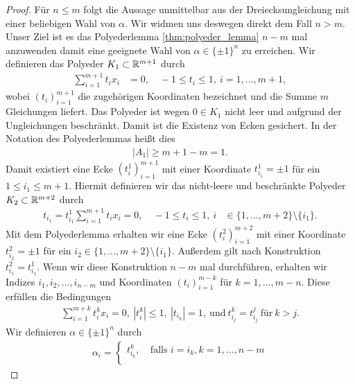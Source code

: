 \begin{proof}
	Für $ n \leq m $ folgt die Aussage unmittelbar aus der Dreiecksungleichung mit einer beliebigen Wahl von $ \alpha $.
	Wir widmen uns deswegen direkt dem Fall $ n > m $. 
	Unser Ziel ist es das Polyederlemma \ref{thm:polyeder_lemma} $ n-m $ mal anzuwenden damit eine geeignete Wahl von $  \alpha \in \{\pm 1\}^n  $ zu erreichen.
	Wir definieren das Polyeder $ K_1 \subset \mathbb{R}^{m+1} $ durch
	\begin{align*}
		\sum \limits_{i = 1}^{m+1 } t_i x_i&= 0, \quad
		-1 \leq t_i \leq 1 , \ i = 1,..., m+1,
	\end{align*}
	wobei $ (t_i)_{i=1}^{m+1} $ die zugehörigen Koordinaten bezeichnet und die Summe $ m $ Gleichungen liefert.
	Das Polyeder ist wegen $ 0 \in K_1 $  nicht leer und aufgrund der Ungleichungen beschränkt.
	Damit ist die Existenz von Ecken gesichert. 
	In der Notation des Polyederlemmas heißt dies
	\begin{align*}
		|A_1 | \geq m+1 - m = 1.
	\end{align*}
	Damit existiert eine Ecke $ (t^1_i)_{i=1}^{m+1} $
	mit einer Koordinate $ t^1_{i_1} = \pm 1$ für ein $ 1 \leq i_1 \leq m+1 $.
	Hiermit definieren wir das nicht-leere und beschränkte Polyeder $ K_2 \subset \mathbb{R}^{m+2} $ durch
	\begin{align*}
		t_{i_1} = t_{i_1}^1
		\sum \limits_{i = 1}^{m+1 } t_i x_i = 0, \quad 
		-1 \leq t_i \leq 1 , \ i &\in \{1,...,m+2\} \setminus \{i_1\}.
	\end{align*}
	Mit dem Polyederlemma erhalten wir eine Ecke $ (t^2_i)_{i=1}^{m+2} $
	mit einer Koordinate $ t_{i_2}^2 = \pm 1 $ für ein $ i_2 \in \{1,...,m+2\} \setminus \{i_1\} $.
	Außerdem gilt nach Konstruktion $ t^2_{i_1} = t^1_{i_1} $.
	Wenn wir diese Konstruktion $ n-m $ mal durchführen, erhalten wir Indizes 
	$ i_1,i_2,...,i_{n-m} $ und Koordinaten $ (t_i)^{m-k}_{i=1} $ für $ k = 1,...,m-n $. Diese erfüllen die Bedingungen
	\begin{align*}
		\sum \limits_{i = 1}^{m+k} t_i^k x_i = 0, \
		| t_i^k | \leq 1, \
		|t_{i_k}| = 1 , \ \text{und} \
		t^k_{i_j} = t^j_{i_j} \ \text{für} \ k > j.
	\end{align*}
	Wir definieren $ \alpha \in \{\pm 1\}^n $ durch
	\begin{align*}
		\alpha_i = 
		\begin{cases}
			t^k_{i_k}, &\ \text{falls } i = i_k, k = 1, ..., n - m  \\

\end{cases}
\end{align*}
\end{proof}
